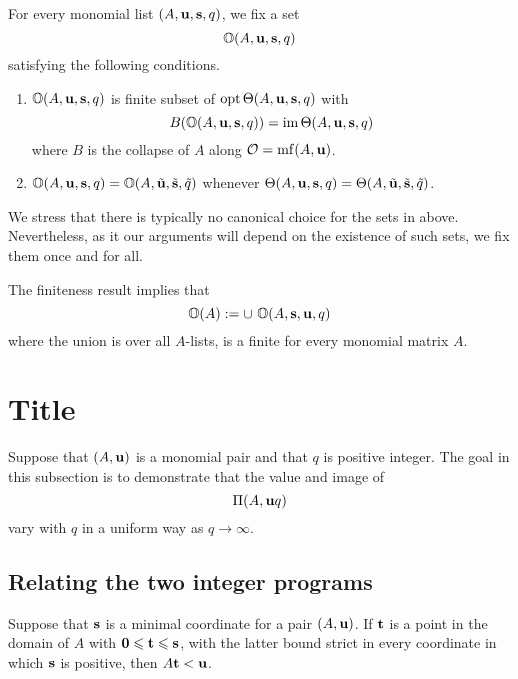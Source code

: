 \documentclass[11pt]{amsart}
\begin{document}
\begin{definition}
\label{orep: D}
  For every monomial list $(A, \mathbf{u}, \mathbf{s}, q)$, we fix a set 
\[ \mathbb{O}(A, \mathbf{u}, \mathbf{s}, q) \] satisfying the following conditions.
\begin{enumerate}
\item  $\mathbb{O}(A, \mathbf{u}, \mathbf{s}, q)$ is finite subset of $\operatorname{opt} \Theta(A, \mathbf{u}, \mathbf{s}, q)$ with \[ B( \mathbb{O}(A, \mathbf{u}, \mathbf{s}, q) ) = \operatorname{im} \Theta(A, \mathbf{u}, \mathbf{s}, q) \]
where $B$ is the collapse of $A$ along $\mathcal{O} = \operatorname{mf}(A, \mathbf{u})$.
 
\item $\mathbb{O}(A, \mathbf{u}, \mathbf{s}, q) = \mathbb{O}(A, \tilde{\mathbf{u}}, \tilde{\mathbf{s}}, \tilde{q})$ whenever  
$\Theta(A, \mathbf{u}, \mathbf{s}, q) = \Theta(A, \tilde{\mathbf{u}}, \tilde{\mathbf{s}}, \tilde{q})$.
\end{enumerate} 
\end{definition}

\begin{remark}
We stress that there is typically no canonical choice for the sets in  above.  Nevertheless, as it our arguments will depend on the existence of such sets, we fix them once and for all.
\end{remark}

\begin{remark}
\label{finiteness of optimal reps: R}
The finiteness result  implies that \[ \mathbb{O}(A) := \cup  \ \mathbb{O}( A, \mathbf{s}, \mathbf{u}, q ) \] where the union is over all $A$-lists, is a finite for every monomial matrix $A$.
\end{remark}

\newpage
\section{Title}
\label{solving: S}

Suppose that $(A, \mathbf{u})$ is a monomial pair and that $q$ is positive integer. The goal in this subsection is to demonstrate that the value and image of \[ \Pi(A, \mathbf{u}q) \] vary with $q$ in a uniform way as $q \to \infty$.

\subsection{Relating the two integer programs}
\label{relating-programs: ss}

\begin{lemma}
\label{less than u: L}  Suppose that $\mathbf{s}$ is a minimal coordinate for a pair $(A, \mathbf{u})$.  If $\mathbf{t}$ is a point in the domain of $A$ with $\mathbf{0} \leqslant \mathbf{t} \leqslant \mathbf{s}$, with the latter bound strict in every coordinate in which $\mathbf{s}$ is positive, then $A \mathbf{t} < \mathbf{u}$.
\end{lemma}
\end{document}
